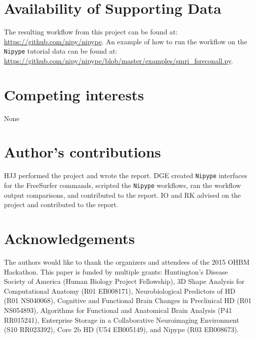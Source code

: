 \documentclass[twocolumn]{bmcart}%
\newcommand{\projURL}{https://github.com/nipy/nipype}
\begin{document}

\begin{backmatter}

\section*{Availability of Supporting Data}
The resulting workflow from this project can be found at: \url{\projURL}. An example of how to run the workflow on the \texttt{Nipype} tutorial data can be found at: \url{https://github.com/nipy/nipype/blob/master/examples/smri_fsreconall.py}.

\section*{Competing interests}
None

\section*{Author's contributions}
HJJ performed the project and wrote the report.
DGE created \texttt{Nipype} interfaces for the FreeSurfer commands, scripted the \texttt{Nipype} workflows, ran the workflow output comparisons, and contributed to the report. IO and RK advised on the project and contributed to the report.

\section*{Acknowledgements}
The authors would like to thank the organizers and attendees of the 2015 OHBM Hackathon.
This paper is funded by multiple grants: Huntington’s Disease Society of America (Human Biology Project Fellowship),   3D Shape Analysis for Computational Anatomy (R01 EB008171), Neurobiological Predictors of HD (R01 NS040068), Cognitive and Functional Brain Changes in Preclinical HD (R01 NS054893), Algorithms for Functional and Anatomical Brain Analysis (P41 RR015241), Enterprise Storage in a Collaborative Neuroimaging Environment (S10 RR023392), Core 2b HD (U54 EB005149), and Nipype (R03 EB008673).



\end{backmatter}
\end{document}
